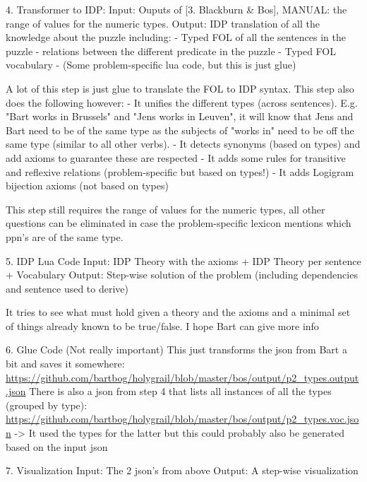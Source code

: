 {4. Transformer to IDP:
Input: Ouputs of [3. Blackburn \& Bos], MANUAL: the range of values for the numeric types.
Output: IDP translation of all the knowledge about the puzzle including:
- Typed FOL of all the sentences in the puzzle
- relations between the different predicate in the puzzle
- Typed FOL vocabulary
- (Some problem-specific lua code, but this is just glue)

A lot of this step is just glue to translate the FOL to IDP syntax. This step also does the following however:
- It unifies the different types (across sentences). E.g. "Bart works in Brussels" and "Jens works in Leuven", it will know that Jens and Bart need to be of the same type as the subjects of "works in" need to be off the same type (similar to all other verbs). 
- It detects synonyms (based on types) and add axioms to guarantee these are respected
- It adds some rules for transitive and reflexive relations (problem-specific but based on types!)
- It adds Logigram bijection axioms (not based on types)

This step still requires the range of values for the numeric types, all other questions can be eliminated in case the problem-specific lexicon mentions which ppn's are of the same type.

5. IDP Lua Code
Input: IDP Theory with the axioms + IDP Theory per sentence + Vocabulary
Output: Step-wise solution of the problem (including dependencies and sentence used to derive)

It tries to see what must hold given a theory and the axioms and a minimal set of things already known to be true/false. I hope Bart can give more info

6. Glue Code
(Not really important)
This just transforms the json from Bart a bit and saves it somewhere: \url{https://github.com/bartbog/holygrail/blob/master/bos/output/p2_types.output.json}
There is also a json from step 4 that lists all instances of all the types (grouped by type): \url{https://github.com/bartbog/holygrail/blob/master/bos/output/p2_types.voc.json}
-> It used the types for the latter but this could probably also be generated based on the input json

7. Visualization
Input: The 2 json's from above
Output: A step-wise visualization
}

